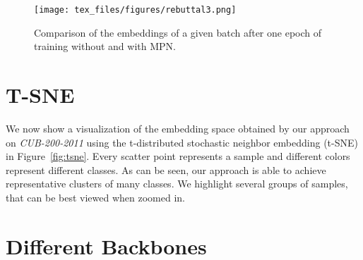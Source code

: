 \documentclass{article}
\begin{document}
\begin{figure*}
    \centering
    \texttt{[image: tex\_files/figures/rebuttal3.png]}
    \caption{Comparison of the embeddings of a given batch after one epoch of training without and with MPN.}
    \label{fig:epoch_comp}
\end{figure*}


\section{T-SNE}
\label{sec:tsne}
We now show a visualization of the embedding space obtained by our approach on \textit{CUB-200-2011} using the t-distributed stochastic neighbor embedding (t-SNE) \cite{DBLP:journals/ml/MaatenH12} in Figure~\ref{fig:tsne}. Every scatter point represents a sample and different colors represent different classes. As can be seen, our approach is able to achieve representative clusters of many classes. We highlight several groups of samples, that can be best viewed when zoomed in. 



\iffalse
\section{Different Backbones}
\label{sec:backbone}
\begin{table}[hbt!]
\centering
{}
\caption{Performance of our approach using DenseNet201 as backbone architecture on CUB-200-2011 and Cars196 compared to ResNet50.}
\label{tab:backbone}
\end{table}
\end{document}

